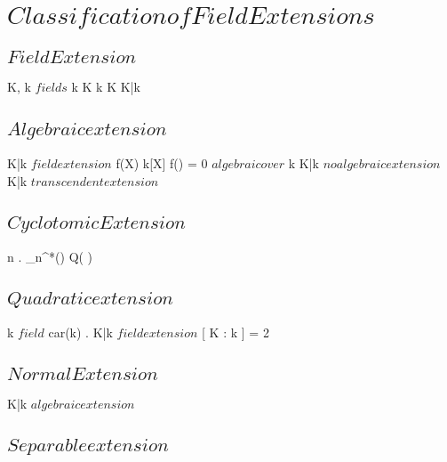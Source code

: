 \documentclass[a5paper]{book}
\begin{document}
\section{ $ Classification of Field Extensions $ }
{
	\subsection{ $ Field Extension $ }

	{
		K, k $ fields $
	}
	{
		k \subset K
	}
	\denote
	{
		k \subset K \as K|k
	}

	\subsection{ $ Algebraic extension $ }

	{
		K|k $ field extension $
	}
	{
		\ex f(X) \in k[X] \suchthat f(\theta) = 0 
	}
	{
		{
			\theta $ algebraic over $ k
		}
	}
	\denote
	{
		K|k $ no algebraic extension $ \as K|k $ transcendent extension $
	}

	\subsection{ $ Cyclotomic Extension $ }

	{
		n \in \N.
		\zeta \in \mu_n^*(\C)
	}
	{
		Q( \zeta ) \extends \Q
	}


	\subsection{ $ Quadratic extension $ }

	{
		k $ field $ \suchthat car(k) .
		K|k $ field extension $
	}
	{
		[ K : k ] = 2
	}


	\subsection{ $ Normal Extension $ }

	{
		K|k $ algebraic extension $
	}
	{
	}	


	\subsection{ $ Separable extension $ }
	
}
\end{document}
